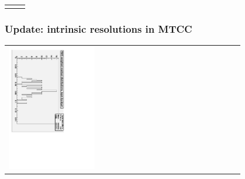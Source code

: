 \documentclass[compress]{beamer}
\begin{document}
\begin{frame}
\begin{center}
\begin{tabular}{p{0.4\linewidth} p{0.5\linewidth}}
\begin{minipage}{\linewidth}
\end{minipage}
\end{tabular}
\end{center}
\end{frame}

\begin{frame}
\frametitle{Update: intrinsic resolutions in MTCC}

\begin{center}
\begin{tabular}{p{0.4\linewidth} c p{0.4\linewidth}}
  \begin{minipage}{\linewidth}
    \includegraphics[height=\linewidth, angle=90]{rms_of_layer_distributions.pdf}
  \end{minipage} & &
  \begin{minipage}{\linewidth}

\end{minipage}
\end{tabular}
\end{center}
\end{frame}
\end{document}
